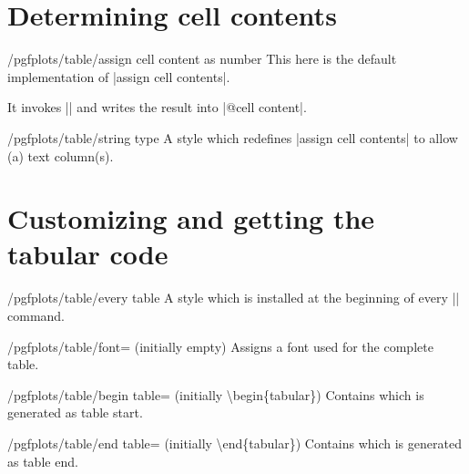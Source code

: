 \section{Determining cell contents}

\begin{key}{/pgfplots/table/assign cell content as number}
	This here is the default implementation of |assign cell contents|. 
	
	It invokes |\pgfmathprintnumberto| and writes the result into |@cell content|.
\end{key}

\begin{stylekey}{/pgfplots/table/string type}
	A style which redefines |assign cell contents| to allow (a) text column(s).
\end{stylekey}

\section{Customizing and getting the tabular code}
\begin{stylekey}{/pgfplots/table/every table}
	A style which is installed at the beginning of every |\pgfplotstabletypeset| command.
\end{stylekey}

\begin{key}{/pgfplots/table/font= (initially empty)}
	Assigns a font used for the complete table.
\end{key}

\begin{key}{/pgfplots/table/begin table= (initially \textbackslash begin\{tabular\})}
	Contains  which is generated as table start.
\end{key}
\begin{key}{/pgfplots/table/end table= (initially \textbackslash end\{tabular\})}
	Contains  which is generated as table end.
\end{key}

